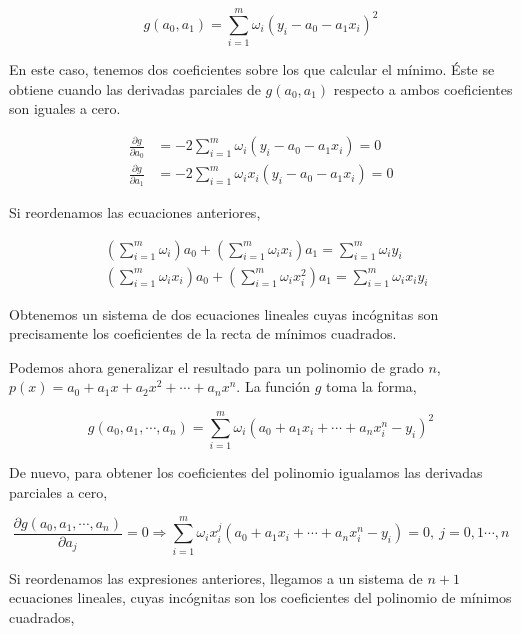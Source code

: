 \begin{equation*}
g(a_0,a_1)=\sum_{i=1}^m \omega_i\left(y_i-a_0-a_1 x_i \right)^2
\end{equation*}
 
En este caso, tenemos dos coeficientes sobre los que calcular el mínimo. Éste se obtiene cuando las derivadas parciales de $g(a_0,a_1)$ respecto a ambos coeficientes son iguales a cero. 

\begin{align*}
\frac{\partial g}{\partial a_0}&=-2\sum_{i=1}^m \omega_i (y_i-a_0-a_1 x_i) = 0\\
\frac{\partial g}{\partial a_1}&=-2\sum_{i=1}^m \omega_i x_i(y_i-a_0-a_1 x_i) = 0
\end{align*} 
 
Si reordenamos las ecuaciones anteriores, 

\begin{align*}
&\left(\sum_{i=1}^m \omega_i\right)a_0+ \left(\sum_{i=1}^m \omega_ix_i\right)a_1 =\sum_{i=1}^m \omega_iy_i\\
&\left(\sum_{i=1}^m \omega_ix_i\right)a_0+ \left(\sum_{i=1}^m \omega_ix_i^2\right)a_1 =\sum_{i=1}^m \omega_ix_iy_i
\end{align*}

Obtenemos un sistema de dos ecuaciones lineales cuyas incógnitas son precisamente los coeficientes de la recta de mínimos cuadrados.

Podemos ahora generalizar el resultado para un polinomio de grado $n$, $p(x)=a_0+a_1x+a_2x^2+\cdots +a_nx^n$. La función $g$ toma la forma,

\begin{equation*}
g(a_0,a_1,\cdots, a_n)=\sum_{i=1}^m \omega_i \left (a_0+a_1x_i+\cdots+ a_nx_i^n-y_i\right)^2
\end{equation*}

De nuevo, para obtener los coeficientes del polinomio igualamos las derivadas parciales a cero,

\begin{equation*}
\frac{\partial g(a_0,a_1,\cdots, a_n)}{\partial a_j}=0 \Rightarrow \sum_{i=1}^m \omega_i x_i^j \left( a_0+a_1x_i+\cdots + a_nx_i^n-y_i\right)=0, \ j=0,1\cdots, n
\end{equation*} 

Si reordenamos las expresiones anteriores, llegamos a un sistema de $n+1$ ecuaciones lineales, cuyas incógnitas son los coeficientes del polinomio de mínimos cuadrados,

